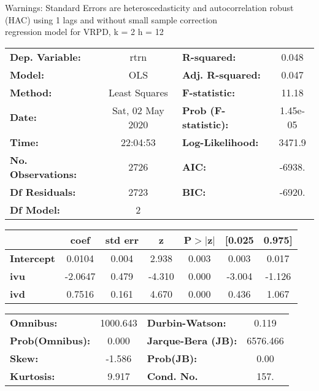 Warnings: \newline
 [1] Standard Errors are heteroscedasticity and autocorrelation robust (HAC) using 1 lags and without small sample correction\\ 

regression model for VRPD, k = 2 h = 12\begin{center}
\begin{tabular}{lclc}
\toprule
\textbf{Dep. Variable:}    &       rtrn       & \textbf{  R-squared:         } &     0.048   \\
\textbf{Model:}            &       OLS        & \textbf{  Adj. R-squared:    } &     0.047   \\
\textbf{Method:}           &  Least Squares   & \textbf{  F-statistic:       } &     11.18   \\
\textbf{Date:}             & Sat, 02 May 2020 & \textbf{  Prob (F-statistic):} &  1.45e-05   \\
\textbf{Time:}             &     22:04:53     & \textbf{  Log-Likelihood:    } &    3471.9   \\
\textbf{No. Observations:} &        2726      & \textbf{  AIC:               } &    -6938.   \\
\textbf{Df Residuals:}     &        2723      & \textbf{  BIC:               } &    -6920.   \\
\textbf{Df Model:}         &           2      & \textbf{                     } &             \\
\bottomrule
\end{tabular}
\begin{tabular}{lcccccc}
                   & \textbf{coef} & \textbf{std err} & \textbf{z} & \textbf{P$> |$z$|$} & \textbf{[0.025} & \textbf{0.975]}  \\
\midrule
\textbf{Intercept} &       0.0104  &        0.004     &     2.938  &         0.003        &        0.003    &        0.017     \\
\textbf{ivu}       &      -2.0647  &        0.479     &    -4.310  &         0.000        &       -3.004    &       -1.126     \\
\textbf{ivd}       &       0.7516  &        0.161     &     4.670  &         0.000        &        0.436    &        1.067     \\
\bottomrule
\end{tabular}
\begin{tabular}{lclc}
\textbf{Omnibus:}       & 1000.643 & \textbf{  Durbin-Watson:     } &    0.119  \\
\textbf{Prob(Omnibus):} &   0.000  & \textbf{  Jarque-Bera (JB):  } & 6576.466  \\
\textbf{Skew:}          &  -1.586  & \textbf{  Prob(JB):          } &     0.00  \\
\textbf{Kurtosis:}      &   9.917  & \textbf{  Cond. No.          } &     157.  \\
\bottomrule
\end{tabular}
\end{center}

